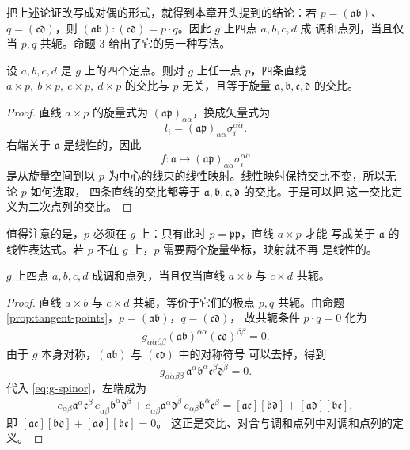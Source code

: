 \begin{remark}
把上述论证改写成对偶的形式，就得到本章开头提到的结论：若 $p=(\mathfrak a\mathfrak b)$、
$q=(\mathfrak c\mathfrak d)$，则
$(\mathfrak a\mathfrak b):(\mathfrak c\mathfrak d)=p\cdot q$。因此 $g$ 上四点 $a,b,c,d$ 成
调和点列，当且仅当 $p,q$ 共轭。命题 3 给出了它的另一种写法。
\end{remark}

\begin{proposition}\label{prop:crossratio-spinor}
设 $a,b,c,d$ 是 $g$ 上的四个定点。则对 $g$ 上任一点 $p$，四条直线
$a\times p,\ b\times p,\ c\times p,\ d\times p$ 的交比与 $p$ 无关，且等于旋量
$\mathfrak a,\mathfrak b,\mathfrak c,\mathfrak d$ 的交比。
\end{proposition}

\begin{proof}
直线 $a\times p$ 的旋量式为 $(\mathfrak a\mathfrak p)_{\alpha\dot\alpha}$，换成矢量式为
\[
l_i=(\mathfrak a\mathfrak p)_{\alpha\dot\alpha}\sigma^{\alpha\dot\alpha}_i .
\]
右端关于 $\mathfrak a$ 是线性的，因此
\[
f:\mathfrak a\longmapsto(\mathfrak a\mathfrak p)_{\alpha\dot\alpha}\sigma^{\alpha\dot\alpha}_i
\]
是从旋量空间到以 $p$ 为中心的线束的线性映射。线性映射保持交比不变，所以无论 $p$ 如何选取，
四条直线的交比都等于 $\mathfrak a,\mathfrak b,\mathfrak c,\mathfrak d$ 的交比。于是可以把
这一交比定义为二次点列的交比。
\end{proof}

值得注意的是，$p$ 必须在 $g$ 上：只有此时 $p=\mathfrak p\mathfrak p$，直线 $a\times p$ 才能
写成关于 $\mathfrak a$ 的线性表达式。若 $p$ 不在 $g$ 上，$p$ 需要两个旋量坐标，映射就不再
是线性的。

\begin{proposition}\label{prop:harmonic}
$g$ 上四点 $a,b,c,d$ 成调和点列，当且仅当直线 $a\times b$ 与 $c\times d$ 共轭。
\end{proposition}

\begin{proof}
直线 $a\times b$ 与 $c\times d$ 共轭，等价于它们的极点 $p,q$ 共轭。由命题
\ref{prop:tangent-points}，$p=(\mathfrak a\mathfrak b)$，$q=(\mathfrak c\mathfrak d)$，
故共轭条件 $p\cdot q=0$ 化为
\[
g_{\alpha\dot\alpha\beta\dot\beta}
(\mathfrak a\mathfrak b)^{\alpha\dot\alpha}(\mathfrak c\mathfrak d)^{\beta\dot\beta}=0 .
\]
由于 $g$ 本身对称，$(\mathfrak a\mathfrak b)$ 与 $(\mathfrak c\mathfrak d)$ 中的对称符号
可以去掉，得到
\[
g_{\alpha\dot\alpha\beta\dot\beta}\,
\mathfrak a^\alpha\mathfrak b^{\dot\alpha}\mathfrak c^\beta\mathfrak d^{\dot\beta}=0 .
\]
代入 \eqref{eq:g-spinor}，左端成为
\[
e_{\alpha\beta}\mathfrak a^\alpha\mathfrak c^\beta\,
e_{\dot\alpha\dot\beta}\mathfrak b^{\dot\alpha}\mathfrak d^{\dot\beta}
+e_{\alpha\dot\beta}\mathfrak a^\alpha\mathfrak d^{\dot\beta}\,
e_{\dot\alpha\beta}\mathfrak b^{\dot\alpha}\mathfrak c^\beta
=[\mathfrak a\mathfrak c][\mathfrak b\mathfrak d]+[\mathfrak a\mathfrak d][\mathfrak b\mathfrak c],
\]
即 $[\mathfrak a\mathfrak c][\mathfrak b\mathfrak d]+[\mathfrak a\mathfrak d][\mathfrak b\mathfrak c]=0$。
这正是交比、对合与调和点列中对调和点列的定义。
\end{proof}

